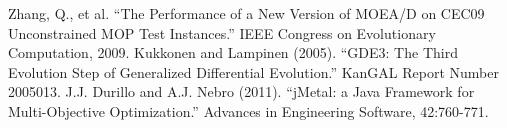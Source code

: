\newline
\newline
\noindent
Zhang, Q., et al. ``The Performance of a New Version of MOEA/D on CEC09 Unconstrained MOP Test Instances.'' IEEE Congress on Evolutionary Computation, 2009. 
\newline
\newline
\noindent
Kukkonen and Lampinen (2005). ``GDE3: The Third Evolution Step of Generalized Differential Evolution.'' KanGAL Report Number 2005013. 
\newline
\newline
\noindent
J.J. Durillo and A.J. Nebro (2011).  ``jMetal: a Java Framework for Multi-Objective Optimization.''  Advances in Engineering Software, 42:760-771. 